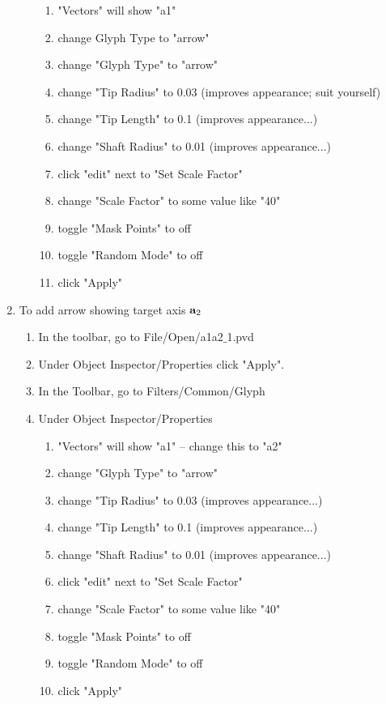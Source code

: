 \begin{enumerate}
\begin{enumerate}
    \begin{enumerate}
    \item "Vectors" will show "a1"
    \item change Glyph Type to "arrow"
    \item change "Glyph Type" to "arrow"
    \item change "Tip Radius" to 0.03 (improves appearance; suit yourself)
    \item change "Tip Length" to 0.1  (improves appearance...)
    \item change "Shaft Radius" to 0.01 (improves appearance...)
    \item click "edit" next to "Set Scale Factor"
    \item change "Scale Factor" to some value like "40"
    \item toggle "Mask Points" to off
    \item toggle "Random Mode" to off
    \item click "Apply"
    \end{enumerate}
  \end{enumerate}

\item To add arrow showing target axis ${\bf a}_2$
  \begin{enumerate}
  \item In the toolbar, go to File/Open/a1a2$\_$1.pvd
  \item Under Object Inspector/Properties click "Apply".
  \item In the Toolbar, go to Filters/Common/Glyph
  \item Under Object Inspector/Properties 
    \begin{enumerate}
    \item "Vectors" will show "a1" -- change this to "a2"
    \item change "Glyph Type" to "arrow"
    \item change "Tip Radius" to 0.03 (improves appearance...)
    \item change "Tip Length" to 0.1  (improves appearance...)
    \item change "Shaft Radius" to 0.01 (improves appearance...)
    \item click "edit" next to "Set Scale Factor"
    \item change "Scale Factor" to some value like "40"
    \item toggle "Mask Points" to off
    \item toggle "Random Mode" to off
    \item click "Apply"
   \end{enumerate}
\end{enumerate}


\end{enumerate}
